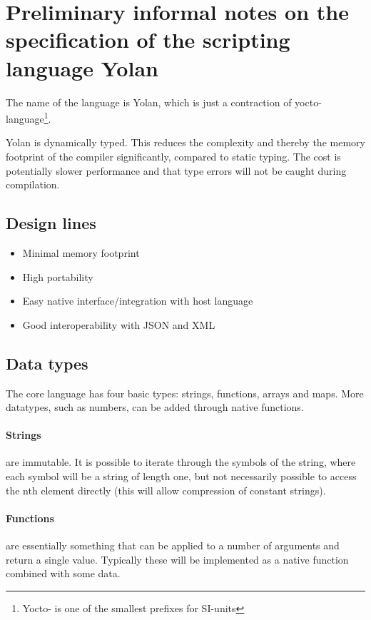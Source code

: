 \section{Preliminary informal notes on the specification of the scripting language Yolan}
The name of the language is Yolan, which is just a contraction of
yocto-language\footnote{Yocto- is one of the smallest prefixes for SI-units}.

Yolan is dynamically typed. 
This reduces the complexity and thereby the memory footprint of the compiler significantly, compared to static typing. 
The cost is potentially slower performance and that type errors will not be caught during compilation.

\subsection{Design lines}

\begin{itemize}
\item Minimal memory footprint
\item High portability
\item Easy native interface/integration with host language
\item Good interoperability with JSON and XML
\end{itemize}

\subsection{Data types}

The core language has four basic types: strings, functions, arrays and maps.
More datatypes, such as numbers, can be added through native functions.

\paragraph{Strings} are immutable. 
It is possible to iterate through the symbols of the string, where each symbol will be a string of length one, but not necessarily possible to access the nth element directly (this will allow compression of constant strings).

\paragraph{Functions} are essentially something that can be applied to a number of arguments and return a single value. Typically these will be implemented as a native function combined with some data.

